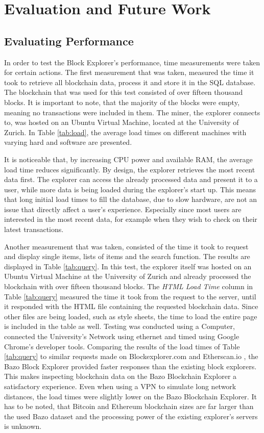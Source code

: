 \chapter{Evaluation and Future Work}
\section{Evaluating Performance}

In order to test the Block Explorer's performance, time measurements were taken for certain actions. 
The first measurement that was taken, measured the time it took to retrieve all blockchain data, process it and store it in the SQL database. The blockchain that was used for this test consisted of over fifteen thousand blocks. It is important to note, that the majority of the blocks were empty, meaning no transactions were included in them. The miner, the explorer connects to, was hosted on an Ubuntu \cite{ubuntu} Virtual Machine, located at the University of Zurich. In Table \ref{tab:load}, the average load times on different machines with varying hard and software are presented. 

It is noticeable that, by increasing CPU power and available RAM, the average load time reduces significantly. By design, the explorer retrieves the most recent data first. The explorer can access the already processed data and present it to a user, while more data is being loaded during the explorer's start up. This means that long initial load times to fill the database, due to slow hardware, are not an issue that directly affect a user's experience. Especially since most users are interested in the most recent data, for example when they wish to check on their latest transactions.

Another measurement that was taken, consisted of the time it took to request and display single items, lists of items and the search function. The results are displayed in Table \ref{tab:query}. In this test, the explorer itself was hosted on an Ubuntu Virtual Machine at the University of Zurich and already processed the blockchain with over fifteen thousand blocks. The \emph{HTML Load Time} column in Table \ref{tab:query} measured the time it took from the request to the server, until it responded with the HTML file containing the requested blockchain data. Since other files are being loaded, such as style sheets, the time to load the entire page is included in the table as well. Testing was conducted using a Computer, connected the University's Network using ethernet and timed using Google Chrome's \cite{chrome} developer tools.
\newpage
Comparing the results of the load times of Table \ref{tab:query} to similar requests made on Blockexplorer.com \cite{blockexplorer} and Etherscan.io \cite{etherscan}, the Bazo Block Explorer provided faster responses than the existing block explorers. This makes inspecting blockchain data on the Bazo Blockchain Explorer a satisfactory experience. Even when using a VPN to simulate long network distances, the load times were slightly lower on the Bazo Blockchain Explorer. It has to be noted, that Bitcoin and Ethereum blockchain sizes are far larger than the used Bazo dataset \cite{bitinfo} and the processing power of the existing explorer's servers is unknown.

